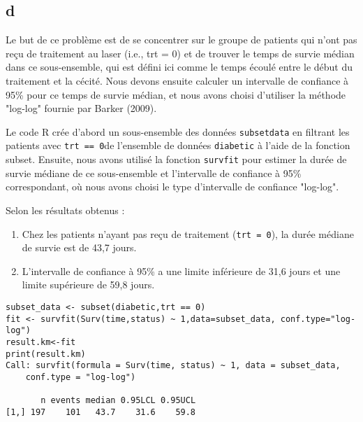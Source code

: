 \documentclass[../main.tex]{subfiles}
\begin{document}
\begin{CJK*}{UTF8}{gbsn}
\section{d}

Le but de ce problème est de se concentrer sur le groupe de patients qui n'ont pas reçu de traitement au laser (i.e., trt = 0) et de trouver le temps de survie médian dans ce sous-ensemble, qui est défini ici comme le temps écoulé entre le début du traitement et la cécité. Nous devons ensuite calculer un intervalle de confiance à 95\% pour ce temps de survie médian, et nous avons choisi d'utiliser la méthode "log-log" fournie par Barker (2009).

Le code R crée d'abord un sous-ensemble des données \texttt{subsetdata} en filtrant les patients avec \texttt{trt == 0}de l'ensemble de données \texttt{diabetic} à l'aide de la fonction subset. Ensuite, nous avons utilisé la fonction \texttt{survfit} pour estimer la durée de survie médiane de ce sous-ensemble et l'intervalle de confiance à 95\% correspondant, où nous avons choisi le type d'intervalle de confiance "log-log".

Selon les résultats obtenus :
\begin{enumerate}
  \item Chez les patients n'ayant pas reçu de traitement (\texttt{trt = 0}), la durée médiane de survie est de 43,7 jours.
  \item L'intervalle de confiance à 95\% a une limite inférieure de 31,6 jours et une limite supérieure de 59,8 jours.
\end{enumerate}

\begin{lstlisting}
subset_data <- subset(diabetic,trt == 0)
fit <- survfit(Surv(time,status) ~ 1,data=subset_data, conf.type="log-log")
result.km<-fit
print(result.km)
Call: survfit(formula = Surv(time, status) ~ 1, data = subset_data, 
    conf.type = "log-log")

       n events median 0.95LCL 0.95UCL
[1,] 197    101   43.7    31.6    59.8
\end{lstlisting}

\end{CJK*}
\end{document}
